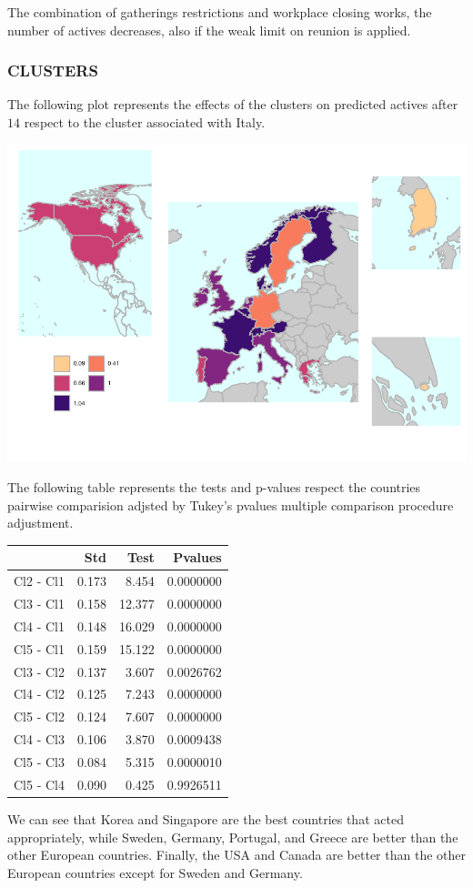 \documentclass[
  6pt,
]{article}
\begin{document}
The combination of gatherings restrictions and workplace closing works,
the number of actives decreases, also if the weak limit on reunion is
applied.

\hypertarget{clusters}{%
\subsubsection{CLUSTERS}\label{clusters}}

The following plot represents the effects of the clusters on predicted
actives after \(14\) respect to the cluster associated with Italy.

\begin{center}\includegraphics[width=.6\textwidth]{Report_SC_Group3_files/figure-latex/unnamed-chunk-21-1} \end{center}

The following table represents the tests and p-values respect the
countries pairwise comparision adjsted by Tukey's pvalues multiple
comparison procedure adjustment.

\begin{longtable}[]{@{}lrrr@{}}
\toprule
& Std & Test & Pvalues\tabularnewline
\midrule
\endhead
Cl2 - Cl1 & 0.173 & 8.454 & 0.0000000\tabularnewline
Cl3 - Cl1 & 0.158 & 12.377 & 0.0000000\tabularnewline
Cl4 - Cl1 & 0.148 & 16.029 & 0.0000000\tabularnewline
Cl5 - Cl1 & 0.159 & 15.122 & 0.0000000\tabularnewline
Cl3 - Cl2 & 0.137 & 3.607 & 0.0026762\tabularnewline
Cl4 - Cl2 & 0.125 & 7.243 & 0.0000000\tabularnewline
Cl5 - Cl2 & 0.124 & 7.607 & 0.0000000\tabularnewline
Cl4 - Cl3 & 0.106 & 3.870 & 0.0009438\tabularnewline
Cl5 - Cl3 & 0.084 & 5.315 & 0.0000010\tabularnewline
Cl5 - Cl4 & 0.090 & 0.425 & 0.9926511\tabularnewline
\bottomrule
\end{longtable}

We can see that Korea and Singapore are the best countries that acted
appropriately, while Sweden, Germany, Portugal, and Greece are better
than the other European countries. Finally, the USA and Canada are
better than the other European countries except for Sweden and Germany.
\end{document}

